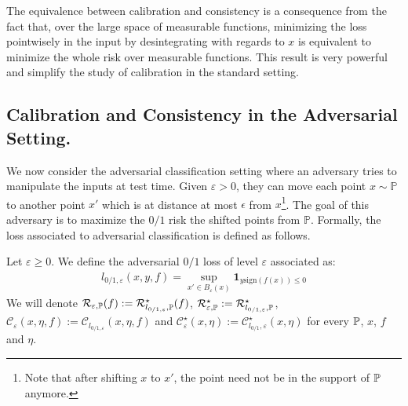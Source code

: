 \begin{rmq}
The equivalence between calibration and consistency is a consequence from the fact that, over the large space of measurable functions, minimizing the loss pointwisely in the input by desintegrating with regards to $x$ is equivalent to minimize the whole risk over measurable functions. This result is very powerful and simplify the study of calibration in the standard setting. 
\end{rmq}



\subsection{Calibration and Consistency in the Adversarial Setting.}


We now consider the adversarial classification setting where an adversary tries to manipulate the inputs at test time. Given  $\varepsilon>0$, they can move each point $x \sim \mathbb{P}$ to another point $x'$ which is at distance at most $\epsilon$ from $x$\footnote{Note that after shifting $x$ to $x'$, the point need not be in the support of $\mathbb{P}$ anymore.}. The goal of this adversary is to maximize the $0/1$ risk the shifted points from $\mathbb{P}$. Formally, the loss associated to adversarial classification is defined as follows.

\begin{definition}
Let $\varepsilon\geq0$. We define the adversarial $0/1$ loss of level $\varepsilon$ associated as:
\begin{align*}
    l_{0/1,\varepsilon}(x,y,f) = \sup_{x'\in B_\varepsilon(x)} \mathbf{1}_{y\text{sign}(f(x))\leq 0}
\end{align*}
We will denote $\mathcal{R}_{\varepsilon,\mathbb{P}}(f) :=\mathcal{R}_{l_{0/1,\varepsilon},\mathbb{P}}^\star(f)$,  $\mathcal{R}_{\varepsilon,\mathbb{P}}^\star :=\mathcal{R}_{l_{0/1,\varepsilon},\mathbb{P}}^\star$, $\mathcal{C}_\varepsilon(x,\eta,f):= \mathcal{C}_{l_{0/1,\varepsilon}}(x,\eta,f)$ and $\mathcal{C}^\star_\varepsilon(x,\eta):= \mathcal{C}^\star_{l_{0/1},\varepsilon}(x,\eta)$ for every $\mathbb{P}$, $x$, $f$ and $\eta$. 
\end{definition}




